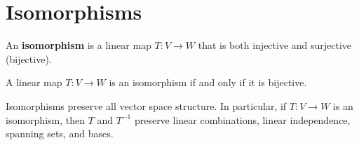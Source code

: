 \section{Isomorphisms}

\begin{definition}
\label{isomorphism-def}
An \textbf{isomorphism} is a linear map $T : V \to W$ that is both injective and surjective (bijective).
\end{definition}

\begin{theorem}
\label{isomorphism-characterization}
A linear map $T : V \to W$ is an isomorphism if and only if it is bijective.
\end{theorem}

\begin{theorem}
\label{isomorphism-preserves}
Isomorphisms preserve all vector space structure. In particular, if $T : V \to W$ is an isomorphism, then $T$ and $T^{-1}$ preserve linear combinations, linear independence, spanning sets, and bases.
\end{theorem}
